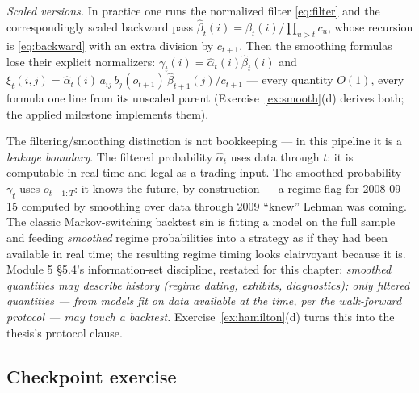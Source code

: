 \documentclass[11pt]{article}
\numberwithin{equation}{section}
\theoremstyle{plain}
\theoremstyle{definition}
\theoremstyle{remark}
\newcounter{exercise}
\newcommand{\alh}{\hat{\alpha}}
\newcommand{\resp}{\gamma}
\begin{document}
\emph{Scaled versions.} In practice one runs the normalized filter \eqref{eq:filter} and the correspondingly scaled backward pass $\hat\beta_t(i) = \beta_t(i) \big/ \prod_{u > t} c_u$, whose recursion is \eqref{eq:backward} with an extra division by $c_{t+1}$. Then the smoothing formulas lose their explicit normalizers: $\resp_t(i) = \alh_t(i)\hat\beta_t(i)$ and $\xi_t(i,j) = \alh_t(i)\, a_{ij}\, b_j(o_{t+1})\, \hat\beta_{t+1}(j)/c_{t+1}$ --- every quantity $O(1)$, every formula one line from its unscaled parent (Exercise~\ref{ex:smooth}(d) derives both; the applied milestone implements them).

\begin{finbox}
The filtering/smoothing distinction is not bookkeeping --- in this pipeline it is a \emph{leakage boundary}. The filtered probability $\alh_t$ uses data through $t$: it is computable in real time and legal as a trading input. The smoothed probability $\resp_t$ uses $o_{t+1:T}$: it knows the future, by construction --- a regime flag for 2008-09-15 computed by smoothing over data through 2009 ``knew'' Lehman was coming. The classic Markov-switching backtest sin is fitting a model on the full sample and feeding \emph{smoothed} regime probabilities into a strategy as if they had been available in real time; the resulting regime timing looks clairvoyant because it is. Module 5 \S5.4's information-set discipline, restated for this chapter: \emph{smoothed quantities may describe history (regime dating, exhibits, diagnostics); only filtered quantities --- from models fit on data available at the time, per the walk-forward protocol --- may touch a backtest.} Exercise~\ref{ex:hamilton}(d) turns this into the thesis's protocol clause.
\end{finbox}


\subsection*{Checkpoint exercise}
\end{document}
